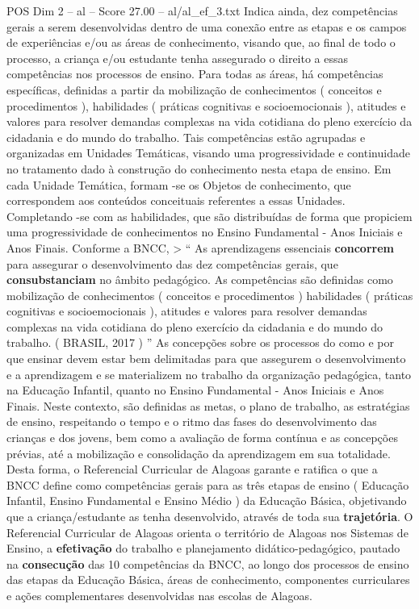 \begin{textsample}{POS Dim 2 – al – Score 27.00 – al/al\_ef\_3.txt}
Indica ainda, dez competências gerais a serem desenvolvidas dentro de uma conexão entre as etapas e os campos de experiências e/ou as áreas de conhecimento, visando que, ao final de todo o processo, a criança e/ou estudante tenha assegurado o direito a essas competências nos processos de ensino.
Para todas as áreas, há competências específicas, definidas a partir da mobilização de conhecimentos ( conceitos e procedimentos ), habilidades ( práticas cognitivas e socioemocionais ), atitudes e valores para resolver demandas complexas na vida cotidiana do pleno exercício da cidadania e do mundo do trabalho.
Tais competências estão agrupadas e organizadas em Unidades Temáticas, visando uma progressividade e continuidade no tratamento dado à construção do conhecimento nesta etapa de ensino.
Em cada Unidade Temática, formam -se os Objetos de conhecimento, que correspondem aos conteúdos conceituais referentes a essas Unidades.
Completando -se com as habilidades, que são distribuídas de forma que propiciem uma progressividade de conhecimentos no Ensino Fundamental - Anos Iniciais e Anos Finais.
Conforme a BNCC, > “ As aprendizagens essenciais \textbf{concorrem} para assegurar o desenvolvimento das dez competências gerais, que \textbf{consubstanciam} no âmbito pedagógico.
As competências são definidas como mobilização de conhecimentos ( conceitos e procedimentos ) habilidades ( práticas cognitivas e socioemocionais ), atitudes e valores para resolver demandas complexas na vida cotidiana do pleno exercício da cidadania e do mundo do trabalho. ( BRASIL, 2017 ) ” As concepções sobre os processos do como e por que ensinar devem estar bem delimitadas para que assegurem o desenvolvimento e a aprendizagem e se materializem no trabalho da organização pedagógica, tanto na Educação Infantil, quanto no Ensino Fundamental - Anos Iniciais e Anos Finais.
Neste contexto, são definidas as metas, o plano de trabalho, as estratégias de ensino, respeitando o tempo e o ritmo das fases do desenvolvimento das crianças e dos jovens, bem como a avaliação de forma contínua e as concepções prévias, até a mobilização e consolidação da aprendizagem em sua totalidade.
Desta forma, o Referencial Curricular de Alagoas garante e ratifica o que a BNCC define como competências gerais para as três etapas de ensino ( Educação Infantil, Ensino Fundamental e Ensino Médio ) da Educação Básica, objetivando que a criança/estudante as tenha desenvolvido, através de toda sua \textbf{trajetória}.
O Referencial Curricular de Alagoas orienta o território de Alagoas nos Sistemas de Ensino, a \textbf{efetivação} do trabalho e planejamento didático-pedagógico, pautado na \textbf{consecução} das 10 competências da BNCC, ao longo dos processos de ensino das etapas da Educação Básica, áreas de conhecimento, componentes curriculares e ações complementares desenvolvidas nas escolas de Alagoas.

\end{textsample}
